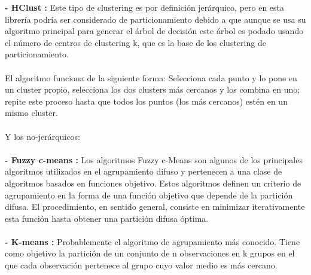 \documentclass[14pt]{extarticle}
\theoremstyle{definition}
\theoremstyle{remark}
\begin{document}
\textbf{- HClust \citep{web:hclustclustering}:} Este tipo de clustering es por definición jerárquico, pero en esta librería podría ser considerado de particionamiento debido a que aunque se usa su algoritmo principal para generar el árbol de decisión este árbol es podado usando el número de centros de clustering k, que es la base de los clustering de particionamiento.\\\\El algoritmo funciona de la siguiente forma: Selecciona cada punto y lo pone en un cluster propio, selecciona los dos clusters más cercanos y los combina en uno; repite este proceso hasta que todos los puntos (los más cercanos) estén en un mismo cluster.\\\\
Y los no-jerárquicos:\\\\
\textbf{- Fuzzy c-means \citep{wiki:fuzzyclustering}:} Los algoritmos Fuzzy c-Means son algunos de los principales algoritmos utilizados en el agrupamiento difuso y pertenecen a una clase de algoritmos basados en funciones objetivo. Estos algoritmos definen un criterio de agrupamiento en la forma de una función objetivo que depende de la partición difusa. El procedimiento, en sentido general, consiste en minimizar iterativamente esta función hasta obtener una partición difusa óptima.\\\\
\textbf{- K-means \citep{wiki:kmeans}:} Probablemente el algoritmo de agrupamiento más conocido. Tiene como objetivo la partición de un conjunto de n observaciones en k grupos en el que cada observación pertenece al grupo cuyo valor medio es más cercano.
\end{document}
